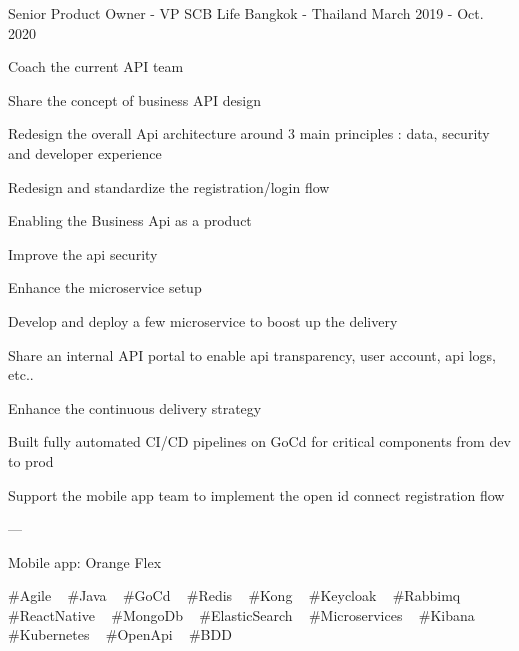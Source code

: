 \begin{cventries}
  \cventry
    {Senior Product Owner - VP} %
    {SCB Life} %
    {Bangkok - Thailand} %
    {March 2019 - Oct. 2020} %
    {
      \begin{cvitems} %
        \item {Coach the current API team}
        \item {Share the concept of business API design}
        \item {Redesign the overall Api architecture around 3 main principles : data, security and developer experience}
        \item {Redesign and standardize the registration/login flow}
        \item {Enabling the Business Api as a product}
        \item {Improve the api security}
        \item {Enhance the microservice setup}
        \item {Develop and deploy a few microservice to boost up the delivery}
        \item {Share an internal API portal to enable api transparency, user account, api logs, etc..}
        \item {Enhance the continuous delivery strategy}
        \item {Built fully automated CI/CD pipelines on GoCd for critical components from dev to prod}
        \item {Support the mobile app team to implement the open id connect registration flow}
        \item {---}
        \item {Mobile app: Orange Flex}
      \end{cvitems}
    }
    {
      \#Agile ~
      \#Java ~
      \#GoCd ~
      \#Redis ~
      \#Kong ~
      \#Keycloak ~
      \#Rabbimq ~
      \#ReactNative ~
      \#MongoDb ~
      \#ElasticSearch ~
      \#Microservices ~
      \#Kibana ~
      \#Kubernetes ~
      \#OpenApi ~
      \#BDD
    }


\end{cventries}
